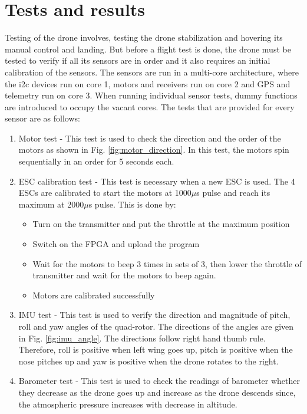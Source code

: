 \chapter{Tests and results}\label{ch:test}
Testing of the drone involves, testing the drone stabilization and hovering its manual control and landing. But before a flight test is done, the drone must be tested  to verify if all its sensors are in order and it also requires an initial calibration of the sensors. The sensors are run in a multi-core architecture, where the i2c devices run on core 1, motors and receivers run on core 2 and GPS and telemetry run on core 3. When running individual sensor tests, dummy functions are introduced to occupy the vacant cores. The tests that are provided for every sensor are as follows:
\begin{enumerate}
    \item Motor test - This test is used to check the direction and the order of the motors as shown in Fig. \ref{fig:motor_direction}. In this test, the motors spin sequentially in an order for 5 seconds each.
     \item ESC calibration test - This test is necessary when a new ESC is used. The 4 ESCs are calibrated to start the motors at 1000$\mu$s pulse and reach its maximum at 2000$\mu$s pulse. This is done by:
     \begin{itemize}
         \item Turn on the transmitter and put the throttle at the maximum position
         \item Switch on the FPGA and upload the program
         \item Wait for the motors to beep 3 times in sets of 3, then lower the throttle of transmitter and wait for the motors to beep again.
         \item Motors are calibrated successfully
     \end{itemize}
    \item IMU test - This test is used to verify the direction and magnitude of pitch, roll and yaw angles of the quad-rotor. The directions of the angles are given in Fig. \ref{fig:imu_angle}. The directions follow right hand thumb rule. Therefore, roll is positive when left wing goes up, pitch is positive when the nose pitches up and yaw is positive when the drone rotates to the right.
    \item Barometer test - This test is used to check the readings of barometer whether they decrease as the drone goes up and increase as the drone descends since, the atmospheric pressure increases with decrease in altitude.

\end{enumerate}
